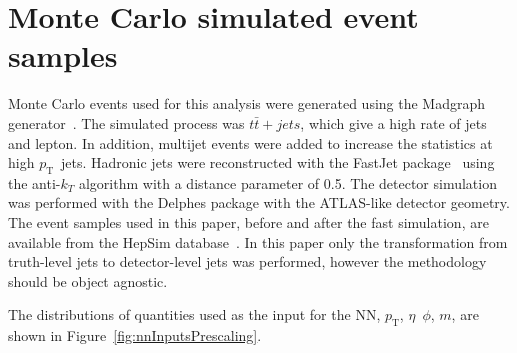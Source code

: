\documentclass[showpacs,showkeys,preprint,prd,nofootinbib,linenumbers,12pt]{revtex4-1}
\def\pt{\ensuremath{p_{\mathrm{T}}}}
\begin{document}
\section{Monte Carlo simulated event samples}

Monte Carlo events used for this analysis were generated using the Madgraph generator~\cite{madgraph}. The simulated process was $t\bar{t}+jets$, which give a high rate of jets and lepton. In addition, multijet events were added to increase the statistics at high \pt\ jets. %
Hadronic jets were reconstructed with the {\sc FastJet} package~\cite{fastjet} using the anti-$k_T$ algorithm \cite{Cacciari:2008gp} with a distance parameter of 0.5.  The detector simulation was performed  with the Delphes package \cite{deFavereau:2013fsa} with the ATLAS-like detector geometry. 
The event samples used in this paper, before and after the fast simulation, are  available from the HepSim database~\cite{Chekanov:2014fga}. In this paper only the transformation from truth-level jets to detector-level jets was performed, however the methodology should be object agnostic. 

The distributions of quantities used as the input for the NN, \pt, $\eta$\, $\phi$, $m$, are shown in Figure~\ref{fig:nnInputsPrescaling}.
\end{document}
